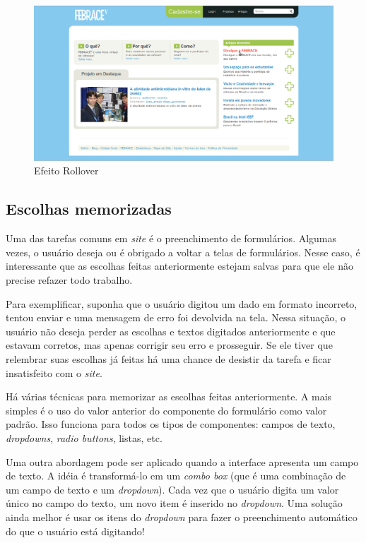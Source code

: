     \begin{figure}[h]
        \begin{center}
    \includegraphics[width=0.7\linewidth]{arquivos/rollover_effect.png}
        \end{center}
        \caption{Efeito Rollover}
        \label{rollover_effect}
    \end{figure}

\subsection{Escolhas memorizadas}

Uma das tarefas comuns em \textit{site} é o preenchimento de formulários. Algumas vezes, o usuário deseja ou é obrigado a voltar a telas de formulários. Nesse caso, é interessante que as escolhas feitas anteriormente estejam salvas para que ele não precise refazer todo trabalho. 

Para exemplificar, suponha que o usuário digitou um dado em formato incorreto, tentou enviar e uma mensagem de erro foi devolvida na tela. Nessa situação, o usuário não deseja perder as escolhas e textos digitados anteriormente e que estavam corretos, mas apenas corrigir seu erro e prosseguir. Se ele tiver que relembrar suas escolhas já feitas há uma chance de desistir da tarefa e ficar insatisfeito com o \textit{site}.

Há várias técnicas para memorizar as escolhas feitas anteriormente. A mais simples é o uso do valor anterior do componente do formulário como valor padrão. Isso funciona para todos os tipos de componentes: campos de texto, \textit{dropdowns}, \textit{radio buttons}, listas, etc.

Uma outra abordagem pode ser aplicado quando a interface apresenta um campo de texto. A idéia é transformá-lo em um \textit{combo box} (que é uma combinação de um campo de texto e um \textit{dropdown}). Cada vez que o usuário digita um valor único no campo do texto, um novo item é inserido no \textit{dropdown}. Uma solução ainda melhor é usar os itens do \textit{dropdown} para fazer o preenchimento automático do que o usuário está digitando!

